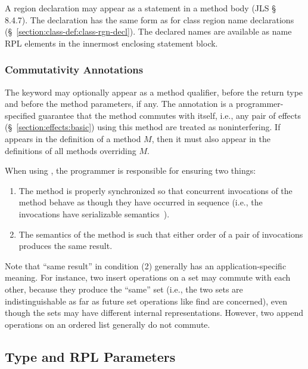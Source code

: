 A region declaration may appear as a statement in a method body (JLS
\S~ 8.4.7).  The declaration has the same form as for class region
name declarations (\S~\ref{section:class-def:class-rgn-decl}).  The
declared names are available as name RPL elements in the innermost
enclosing statement block.

\subsubsection{Commutativity Annotations}
\label{section:class-def:methods:commutativity}

The keyword  may optionally appear as a method
qualifier, before the return type and before the method parameters, if
any.  The  annotation is a programmer-specified
guarantee that the method commutes with itself, i.e., any pair of
 effects (\S~\ref{section:effects:basic}) using this
method are treated as noninterfering.  If  appears in
the definition of a method $M$, then it must also appear in the
definitions of all methods overriding $M$.

When using , the programmer is responsible for
ensuring two things:
%
\begin{enumerate}
%
\item The method is properly synchronized so that concurrent
  invocations of the method behave as though they have occurred in
  sequence (i.e., the invocations have serializable
  semantics~\cite{Papadimitriou:Database}).

\item The semantics of the method is such that either order of a pair
  of invocations produces the same result.
%
\end{enumerate}
%
Note that ``same result'' in condition (2) generally has an
application-specific meaning.  For instance, two insert operations on
a set may commute with each other, because they produce the ``same''
set (i.e., the two sets are indistinguishable as far as future set
operations like find are concerned), even though the sets may have
different internal representations.  However, two append operations on
an ordered list generally do not commute.

\subsection{Type and RPL Parameters}
\label{section:class-def:params}


